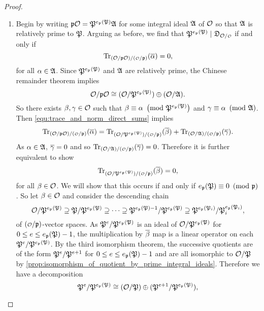 \begin{proof}
      \begin{enumerate}[label=(\roman*)]
        \item Begin by writing $\mathfrak{p}\mathcal{O} = \mathfrak{P}^{e_{\mathfrak{p}}(\mathfrak{P})}\mathfrak{A}$ for some integral ideal $\mathfrak{A}$ of $\mathcal{O}$ so that $\mathfrak{A}$ is relatively prime to $\mathfrak{P}$. Arguing as before, we find that $\mf{P}^{e_{\mf{p}}(\mf{P})} \mid \mf{D}_{\mc{O}/\smc{O}}$ if and only if
        \[
          \Trace_{(\mc{O}/\mf{p}\mc{O})/(\smc{O}/\mf{p})}(\conj{\a}) = 0,
        \]
        for all $\alpha \in \mathfrak{A}$. Since $\mathfrak{P}^{e_{\mathfrak{p}}(\mathfrak{P})}$ and $\mathfrak{A}$ are relatively prime, the Chinese remainder theorem implies
        \[
          \mathcal{O}/\mathfrak{p}\mathcal{O} \cong (\mathcal{O}/\mathfrak{P}^{e_{\mathfrak{p}}(\mathfrak{P})}) \oplus (\mathcal{O}/\mathfrak{A}).
        \]
        So there exists $\beta,\gamma \in \mathcal{O}$ such that $\beta \equiv \alpha \ \left(\text{mod }\mathfrak{P}^{e_{\mathfrak{p}}(\mathfrak{P})}\right)$ and $\gamma \equiv \alpha \ \left(\text{mod }\mathfrak{A}\right)$. Then \cref{equ:trace_and_norm_direct_sums} implies
        \[
          \Trace_{(\mc{O}/\mf{p}\mc{O})/(\smc{O}/\mf{p})}(\conj{\a}) = \Trace_{(\mc{O}/\mf{P}^{e_{\mf{p}}(\mf{P})})/(\smc{O}/\mf{p})}(\conj{\b})+\Trace_{(\mc{O}/\mf{A})/(\smc{O}/\mf{p})}(\conj{\g}).
        \]
        As $\alpha \in \mathfrak{A}$, $\overline{\gamma} = 0$ and so $\Trace_{(\mc{O}/\mf{A})/(\smc{O}/\mf{p})}(\conj{\g}) = 0$. Therefore it is further equivalent to show
        \[
          \Trace_{(\mc{O}/\mf{P}^{e_{\mf{p}}(\mf{P})})/(\smc{O}/\mf{p})}(\conj{\b}) = 0,
        \]
        for all $\beta \in \mathcal{O}$. We will show that this occurs if and only if $e_{\mathfrak{p}}(\mathfrak{P}) \equiv 0 \ \left(\text{mod }\mathfrak{p}\right)$. So let $\beta \in \mathcal{O}$ and consider the descending chain
        \[
          \mathcal{O}/\mathfrak{P}^{e_{\mathfrak{p}}(\mathfrak{P})} \supseteq \mathfrak{P}/\mathfrak{P}^{e_{\mathfrak{p}}(\mathfrak{P})} \supseteq \cdots \supseteq \mathfrak{P}^{e_{\mathfrak{p}}(\mathfrak{P})-1}/\mathfrak{P}^{e_{\mathfrak{p}}(\mathfrak{P})} \supseteq \mathfrak{P}^{e_{\mathfrak{p}}(\mathfrak{P}_{i})}/\mathfrak{P}_{i}^{e_{\mathfrak{p}}(\mathfrak{P}_{i})},
        \]
        of $(\smc{O}/\mf{p})$-vector spaces. As $\mathfrak{P}^{e}/\mathfrak{P}^{e_{\mathfrak{p}}(\mathfrak{P})}$ is an ideal of $\mathcal{O}/\mathfrak{P}^{e_{\mathfrak{p}}(\mathfrak{P})}$ for $0 \le e \le e_{\mathfrak{p}}(\mathfrak{P})-1$, the multiplication by $\overline{\beta}$ map is a linear operator on each $\mathfrak{P}^{e}/\mathfrak{P}^{e_{\mathfrak{p}}(\mathfrak{P})}$. By the third isomorphism theorem, the successive quotients are of the form $\mathfrak{P}^{e}/\mathfrak{P}^{e+1}$ for $0 \le e \le e_{\mathfrak{p}}(\mathfrak{P})-1$ and are all isomorphic to $\mathcal{O}/\mathfrak{P}$ by \cref{prop:isomorphism_of_quotient_by_prime_integral_ideals}. Therefore we have a decomposition
        \[
          \mathfrak{P}^{e}/\mathfrak{P}^{e_{\mathfrak{p}}(\mathfrak{P})} \cong (\mathcal{O}/\mathfrak{P}) \oplus (\mathfrak{P}^{e+1}/\mathfrak{P}^{e_{\mathfrak{p}}(\mathfrak{P})}),
        \]

\end{enumerate}
\end{proof}
